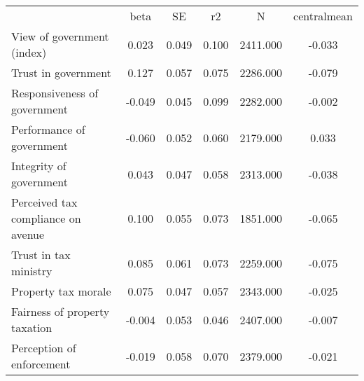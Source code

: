 {\def\sym#1{\ifmmode^{#1}\else\(^{#1}\)\fi} \begin{tabular}{l*{5}{c}} \hline\hline 
& beta & SE & r2 & N & centralmean \\
View of government (index) & 0.023 & 0.049 & 0.100 & 2411.000 & -0.033 \\
Trust in government & 0.127 & 0.057 & 0.075 & 2286.000 & -0.079 \\
Responsiveness of government & -0.049 & 0.045 & 0.099 & 2282.000 & -0.002 \\
Performance of government & -0.060 & 0.052 & 0.060 & 2179.000 & 0.033 \\
Integrity of government & 0.043 & 0.047 & 0.058 & 2313.000 & -0.038 \\
Perceived tax compliance on avenue & 0.100 & 0.055 & 0.073 & 1851.000 & -0.065 \\
Trust in tax ministry & 0.085 & 0.061 & 0.073 & 2259.000 & -0.075 \\
Property tax morale & 0.075 & 0.047 & 0.057 & 2343.000 & -0.025 \\
Fairness of property taxation & -0.004 & 0.053 & 0.046 & 2407.000 & -0.007 \\
Perception of enforcement & -0.019 & 0.058 & 0.070 & 2379.000 & -0.021 \\
\hline\hline \end{tabular} }
